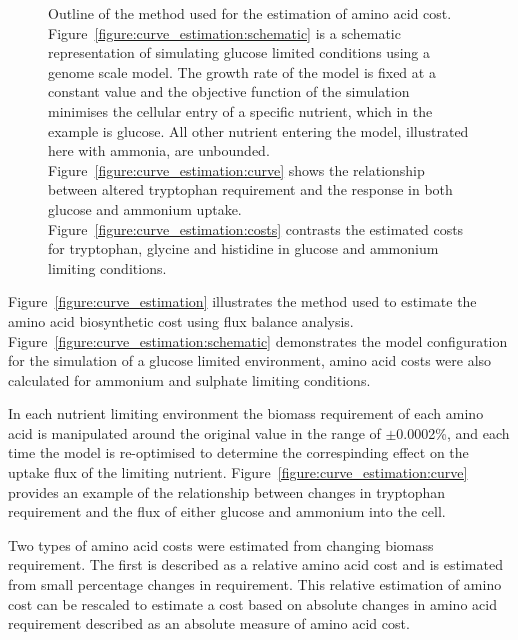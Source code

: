 \begin{figure}%
  \centering
  \hfill
  \hfill
  \hfill
  \caption[Method used for estimation of amino acid cost]{Outline of the method used for the estimation of amino acid cost. Figure~\ref{figure:curve_estimation:schematic} is a schematic representation of simulating glucose limited conditions using a genome scale model. The growth rate of the model is fixed at a constant value and the objective function of the simulation minimises the cellular entry of a specific nutrient, which in the example is glucose. All other nutrient entering the model, illustrated here with ammonia, are unbounded. Figure~\ref{figure:curve_estimation:curve} shows the relationship between altered tryptophan requirement and the response in both glucose and ammonium uptake. Figure~\ref{figure:curve_estimation:costs} contrasts the estimated costs for tryptophan, glycine and histidine in glucose and ammonium limiting conditions. }
  \label{figure:curve_estimation}
\end{figure}%

Figure~\vref{figure:curve_estimation} illustrates the method used to estimate the amino acid biosynthetic cost using flux balance analysis. Figure~\ref{figure:curve_estimation:schematic} demonstrates the model configuration for the simulation of a glucose limited environment, amino acid costs were also calculated for ammonium and sulphate limiting conditions.

In each nutrient limiting environment the biomass requirement of each amino acid is manipulated around the original value in the range of $\pm$0.0002\%, and each time the model is re-optimised to determine the correspinding effect on the uptake flux of the limiting nutrient.  Figure~\ref{figure:curve_estimation:curve} provides an example of the relationship between changes in tryptophan requirement and the flux of either glucose and ammonium into the cell.

Two types of amino acid costs were estimated from changing biomass requirement. The first is described as a relative amino acid cost and is estimated from small percentage changes in requirement. This relative estimation of amino cost can be rescaled to estimate a cost based on absolute changes in amino acid requirement described as an absolute measure of amino acid cost.

